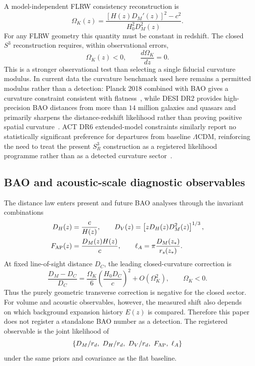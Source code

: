 \documentclass[aps,prd,onecolumn,superscriptaddress,longbibliography,nofootinbib,notitlepage]{revtex4-2}
\begin{document}
A model-independent FLRW consistency reconstruction is
\begin{equation}
\boxed{
  \Omega_K(z)=
  \frac{[H(z)D_M'(z)]^2-c^2}{H_0^2D_M^2(z)} .}
\label{eq:ok_reconstruction}
\end{equation}
For any FLRW geometry this quantity must be constant in redshift. The closed
$S^3$ reconstruction requires, within observational errors,
\begin{equation}
  \Omega_K(z)<0,
  \qquad
  \frac{d\Omega_K}{dz}=0.
\end{equation}
This is a stronger observational test than selecting a single fiducial curvature
modulus. In current data the curvature benchmark used here remains a permitted
modulus rather than a detection: Planck 2018 combined with BAO gives a curvature
constraint consistent with flatness~\cite{Planck2020}, while DESI DR2 provides
high-precision BAO distances from more than $14$ million galaxies and quasars and
primarily sharpens the distance-redshift likelihood rather than proving positive
spatial curvature~\cite{DESIDR2}. ACT DR6 extended-model constraints similarly
report no statistically significant preference for departures from baseline
$\Lambda$CDM, reinforcing the need to treat the present $S^3_R$ construction as a
registered likelihood programme rather than as a detected curvature sector~\cite{ACTDR6Extensions}.

\subsection{BAO and acoustic-scale diagnostic observables}
\label{sec:bao-acoustic-diagnostics}

The distance law enters present and future BAO analyses through the invariant
combinations
\begin{align}
  D_H(z)&=\frac{c}{H(z)},\qquad
  D_V(z)=\left[zD_H(z)D_M^2(z)\right]^{1/3},\\
  F_{\rm AP}(z)&=\frac{D_M(z)H(z)}{c},\qquad
  \ell_A=\pi\frac{D_M(z_\ast)}{r_s(z_\ast)}.
\end{align}
At fixed line-of-sight distance $D_C$, the leading closed-curvature correction is
\begin{equation}
  \frac{D_M-D_C}{D_C}
  =\frac{\Omega_K}{6}\left(\frac{H_0D_C}{c}\right)^2
  +O(\Omega_K^2),
  \qquad \Omega_K<0.
\end{equation}
Thus the purely geometric transverse correction is negative for the closed sector.
For volume and acoustic observables, however, the measured shift also depends on
which background expansion history $E(z)$ is compared. Therefore
this paper does not register a standalone BAO number as a detection. The
registered observable is the joint likelihood of
\begin{equation}
  \left\{D_M/r_d,\ D_H/r_d,\ D_V/r_d,\ F_{\rm AP},\ \ell_A\right\}
\end{equation}
under the same priors and covariance as the flat baseline.
\end{document}

